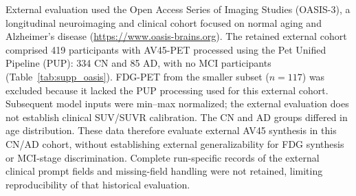 External evaluation used the Open Access Series of Imaging Studies (OASIS-3), a longitudinal neuroimaging and clinical cohort focused on normal aging and Alzheimer's disease (\url{https://www.oasis-brains.org}). The retained external cohort comprised 419 participants with AV45-PET processed using the Pet Unified Pipeline (PUP): 334 CN and 85 AD, with no MCI participants (Table~\ref{tab:supp_oasis}). FDG-PET from the smaller subset ($n=117$) was excluded because it lacked the PUP processing used for this external cohort. Subsequent model inputs were min--max normalized; the external evaluation does not establish clinical SUV/SUVR calibration. The CN and AD groups differed in age distribution. These data therefore evaluate external AV45 synthesis in this CN/AD cohort, without establishing external generalizability for FDG synthesis or MCI-stage discrimination. Complete run-specific records of the external clinical prompt fields and missing-field handling were not retained, limiting reproducibility of that historical evaluation.
